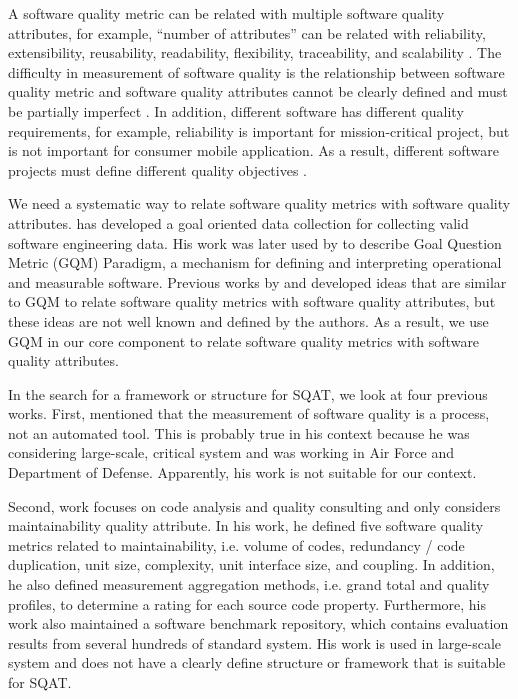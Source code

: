 A software quality metric can be related with multiple software quality attributes, for example,  ``number of attributes'' can be related with reliability, extensibility, reusability, readability, flexibility, traceability, and scalability \cite[]{de2015classifying}. The difficulty in measurement of software quality is the relationship between software quality metric and software quality attributes cannot be clearly defined and must be partially imperfect \cite[]{cavano1978framework}. In addition, different software has different quality requirements, for example, reliability is important for mission-critical project, but is not important for consumer mobile application. As a result, different software projects must define different quality objectives \cite[]{cavano1978framework}. 

We need a systematic way to relate software quality metrics with software quality attributes. \cite{basili1984methodology} has developed a goal oriented data collection for collecting valid software engineering data. His work was later used by \cite{yi1994goal} to describe Goal Question Metric (GQM) Paradigm, a mechanism for defining and interpreting operational and measurable software. Previous works by \cite{cavano1978framework} and \cite{baggen2012standardized} developed ideas that are similar to GQM to relate software quality metrics with software quality attributes, but these ideas are not well known and defined by the authors. As a result, we use GQM in our core component to relate software quality metrics with software quality attributes. 

In the search for a framework or structure for SQAT, we look at four previous works. First, \cite{cavano1978framework} mentioned that the measurement of software quality is a process, not an automated tool. This is probably true in his context because he was considering large-scale, critical system and was working in Air Force and Department of Defense. Apparently, his work is not suitable for our context. 

Second, \cite{baggen2012standardized} work focuses on code analysis and quality consulting and only considers maintainability quality attribute. In his work, he defined five software quality metrics related to maintainability, i.e. volume of codes, redundancy / code duplication, unit size, complexity, unit interface size, and coupling. In addition, he also defined measurement aggregation methods, i.e. grand total and quality profiles, to determine a rating for each source code property. Furthermore, his work also maintained a software benchmark repository, which contains evaluation results from several hundreds of standard system. His work is used in large-scale system and does not have a clearly define structure or framework that is suitable for SQAT. 

